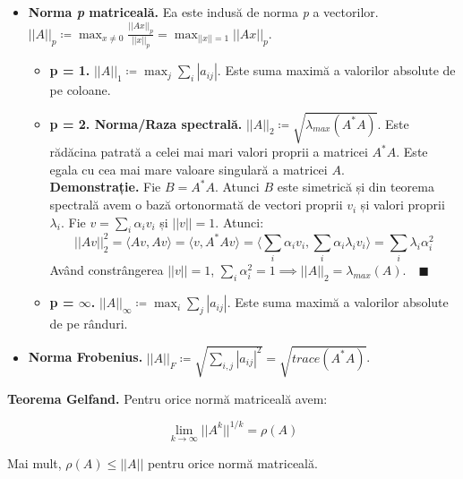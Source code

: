 \documentclass{exam}
\begin{document}
\begin{itemize}
	\item \textbf{Norma \textit{p} matriceală.} Ea este indusă de norma \textit{p} a vectorilor. \\
	      $||A||_p \coloneq \max_{x \neq 0} \frac{||Ax||_p}{||x||_p} = \max_{||x|| = 1} ||Ax||_p$.
	      \begin{itemize}
		      \item \textbf{p = 1.} $||A||_1 \coloneq \max_j \sum_i |a_{ij}|$. Este suma maximă a valorilor absolute
		            de pe coloane.
		      \item \textbf{p = 2. Norma/Raza spectrală.} $||A||_2 \coloneq \sqrt{\lambda_{max}(A^*A)}$.
		            Este rădăcina patrată a celei mai mari valori proprii a matricei $A^*A$.
		            Este egala cu cea mai mare valoare singulară a matricei $A$. \\
		            \textbf{Demonstrație.} Fie $B = A^*A$. Atunci $B$ este
		            simetrică și din teorema spectrală avem o bază ortonormată
		            de vectori proprii $v_i$ și valori proprii $\lambda_i$.
		            Fie $v = \sum_i \alpha_i v_i$ și $||v|| = 1$. Atunci:
		            \begin{equation*}
			            ||Av||^2_2 = \langle Av, Av \rangle = \langle v, A^*Av \rangle = \langle  \sum_{i} \alpha_i v_i, \sum_{i} \alpha_i \lambda_i v_i \rangle = \sum_{i} \lambda_i \alpha_i^2
		            \end{equation*}
		            Având constrângerea $||v|| = 1$, $\sum_{i} \alpha_i^2 = 1 \implies ||A||_2 = \lambda_{max}(A). \quad \blacksquare$

		      \item \textbf{p = $\infty$.} $||A||_{\infty} \coloneq \max_i \sum_j |a_{ij}|$. Este suma maximă a valorilor
		            absolute de pe rânduri.
	      \end{itemize}
	\item \textbf{Norma Frobenius.} $||A||_F \coloneq \sqrt{\sum_{i,j} |a_{ij}|^2} = \sqrt{trace(A^*A)}$.
\end{itemize}

\par \textbf{Teorema Gelfand.} Pentru orice normă matriceală avem:

\begin{equation*}
	\lim_{k \to \infty} ||A^k||^{1/k} = \rho(A)
\end{equation*}

\par Mai mult, $\rho(A) \leq ||A||$ pentru orice normă matriceală.
\end{document}
